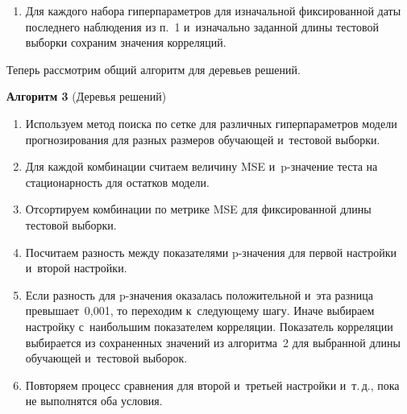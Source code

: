 \begin{multicols}{2}
\begin{enumerate}[1.]
        \item
        Для каждого набора гиперпараметров для изначальной фиксированной даты 
        последнего наблюдения из п.~1 и~изначально заданной длины тестовой выборки сохраним 
        значения корреляций.
        

    \end{enumerate}


Теперь рассмотрим общий алгоритм для де\-ревь\-ев решений.

\vspace*{2pt}

\textbf{Алгоритм 3} (Деревья решений)

    \noindent
    \begin{enumerate}[1.]
    

        \item Используем метод поиска по сетке для различных гиперпараметров модели 
        прогнозирования для разных размеров обучающей и~тес\-то\-вой выборки.

        
        \item

        Для каждой комбинации считаем величину MSE и~p-зна\-че\-ние 
        теста на ста\-ци\-о\-нар\-ность для остатков модели.

        
        
        \item

        Отсортируем комбинации по метрике MSE для фиксированной длины тес\-то\-вой выборки.

        \item

        Посчитаем разность между показателями \mbox{p-зна}\-че\-ния для первой настройки и~второй настройки.

        
        \item

        Если разность для p-зна\-че\-ния оказалась положительной и~эта разница превышает~0,001, 
        то переходим к~следующему шагу. Иначе выбираем настройку с~наибольшим показателем корреляции. 
        Показатель корреляции выбирается из сохраненных значений из алгоритма~2 для выбранной длины 
        обуча\-ющей и~тес\-то\-вой выборок.

        
        \item

        Повторяем процесс сравнения для второй и~треть\-ей настройки и~т.\,д., пока не выполнятся оба условия.


\end{enumerate}
\end{multicols}
